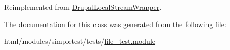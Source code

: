 Reimplemented from \hyperlink{classDrupalLocalStreamWrapper_a61f0d0ef6a489e3fca2152eb64174237}{DrupalLocalStreamWrapper}.

The documentation for this class was generated from the following file:\begin{DoxyCompactItemize}
\item 
html/modules/simpletest/tests/\hyperlink{file__test_8module}{file\_\-test.module}\end{DoxyCompactItemize}
